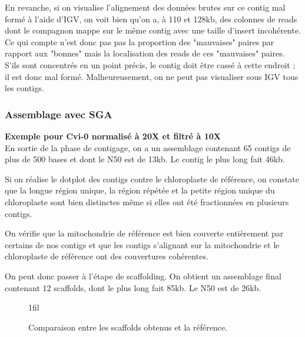 \documentclass[a4paper]{article}
\makeatletter
\newcommand*{\centerfloat}{%
  \parindent \z@
  \leftskip \z@ \@plus 1fil \@minus \textwidth
  \rightskip\leftskip
  \parfillskip \z@skip}
\makeatother
\begin{document}

En revanche, si on visualise l'alignement des données brutes sur ce contig mal formé à l'aide d'IGV, on voit bien qu'on a, à 110 et 128kb, des colonnes de reads dont le compagnon mappe sur le même contig avec une taille d'insert incohérente. Ce qui compte n'est donc pas pas la proportion des "mauvaises" paires par rapport aux "bonnes" mais la localisation des reads de ces "mauvaises" paires. S'ils sont concentrés en un point précis, le contig doit être cassé à cette endroit ; il est donc mal formé. Malheureusement, on ne peut pas visualiser sous IGV tous les contigs. 

\subsubsection{Assemblage avec SGA}
\hspace{1cm}  \textbf{\small Exemple pour Cvi-0 normalisé à 20X et filtré à 10X}\\

\label{sga} En sortie de la phase de contigage, on a un assemblage contenant 65 contigs de plus de 500 bases et dont le N50 est de 13kb. Le contig le plus long fait 46kb. 

Si on réalise le dotplot des contigs contre le chloroplaste de référence, on constate que la longue région unique, la région répétée et la petite région unique du chloroplaste sont bien distinctes même si elles ont été fractionnées en plusieurs contigs. 

On vérifie que la mitochondrie de référence est bien couverte entièrement par certains de nos contigs et que les contigs s'alignant sur la mitochondrie et le chloroplaste de référence ont des couvertures cohérentes.

On peut donc passer à l'étape de scaffolding. On obtient un assemblage final contenant 12 scaffolds, dont le plus long fait 85kb. Le N50 est de 26kb. 

\begin{figure}[H]
\centerfloat

 \hspace{5mm}

\label{sha}
\caption{Comparaison entre les scaffolds obtenus et la référence. }
\end{figure}
\end{document}
